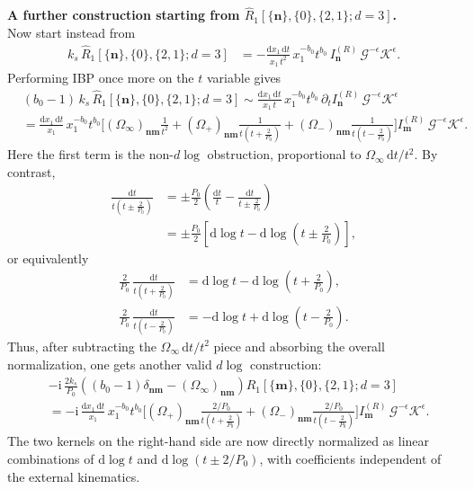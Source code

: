 \documentclass[a4paper]{article}
\newcommand{\n}{\nonumber}
\def\di{{\mathrm{d}}}
\def\ii{\mathrm{i}}
\def\ep{\epsilon}
\newcommand{\mG}{\mathcal{G}}
\newcommand{\mK}{\mathcal{K}}
\begin{document}
\textbf{A further construction starting from $\hat{R}_1[\{\bm n\},\{0\},\{2,1\};d=3]$.} \\
Now start instead from
\begin{align}
	k_s\,\hat{R}_1[\{\bm n\},\{0\},\{2,1\};d=3]
	&= -\frac{\di x_1\,\di t}{x_1\,t^2}\,
	x_1^{-b_0}t^{b_0}\,I^{(R)}_{\bm n}\,\mG^{-\ep}\mK^{\ep}.
\end{align}
Performing IBP once more on the $t$ variable gives
\begin{align}
	&(b_0-1)\,k_s\,\hat{R}_1[\{\bm n\},\{0\},\{2,1\};d=3]
	\sim \frac{\di x_1\,\di t}{x_1\,t}\,
	x_1^{-b_0}t^{b_0}\,\partial_t I^{(R)}_{\bm n}\,\mG^{-\ep}\mK^{\ep} \n\\
	&= \frac{\di x_1\,\di t}{x_1}\,x_1^{-b_0}t^{b_0}
	\Bigg[
	(\Omega_\infty)_{\bm n\bm m}\frac{1}{t^2}
	+(\Omega_+)_{\bm n\bm m}\frac{1}{t\left(t+\frac{2}{P_0}\right)}
	+(\Omega_-)_{\bm n\bm m}\frac{1}{t\left(t-\frac{2}{P_0}\right)}
	\Bigg]
	I^{(R)}_{\bm m}\,\mG^{-\ep}\mK^{\ep}.
\end{align}
Here the first term is the non-$d\log$ obstruction, proportional to $\Omega_\infty\,\di t/t^2$. By contrast,
\begin{align}
	\frac{\di t}{t\left(t\pm \frac{2}{P_0}\right)}
	&= \pm \frac{P_0}{2}
	\left(
	\frac{\di t}{t}
	-\frac{\di t}{t\pm \frac{2}{P_0}}
	\right) \n\\
	&= \pm \frac{P_0}{2}
	\left[
	\di\log t-\di\log\left(t\pm \frac{2}{P_0}\right)
	\right],
\end{align}
or equivalently
\begin{align}
	\frac{2}{P_0}\,\frac{\di t}{t\left(t+\frac{2}{P_0}\right)}
	&= \di\log t-\di\log\left(t+\frac{2}{P_0}\right), \n\\
	\frac{2}{P_0}\,\frac{\di t}{t\left(t-\frac{2}{P_0}\right)}
	&= -\di\log t+\di\log\left(t-\frac{2}{P_0}\right).
\end{align}
Thus, after subtracting the $\Omega_\infty\,\di t/t^2$ piece and absorbing the overall normalization, one gets another valid $d\log$ construction:
\begin{align}
	&-\ii\,\frac{2k_s}{P_0}\left(
	(b_0-1)\delta_{\bm n\bm m}
	-(\Omega_\infty)_{\bm n\bm m}
	\right)\hat{R}_1[\{\bm m\},\{0\},\{2,1\};d=3] \n\\
	&= -\ii\,\frac{\di x_1\,\di t}{x_1}\,x_1^{-b_0}t^{b_0}
	\Bigg[
	(\Omega_+)_{\bm n\bm m}\frac{2/P_0}{t\left(t+\frac{2}{P_0}\right)}  
	+(\Omega_-)_{\bm n\bm m}\frac{2/P_0}{t\left(t-\frac{2}{P_0}\right)}
	\Bigg]
	I^{(R)}_{\bm m}\,\mG^{-\ep}\mK^{\ep}.
\end{align}
The two kernels on the right-hand side are now directly normalized
as linear combinations of $\di\log t$ and $\di\log(t\pm 2/P_0)$,
with coefficients independent of the external kinematics.
\end{document}
